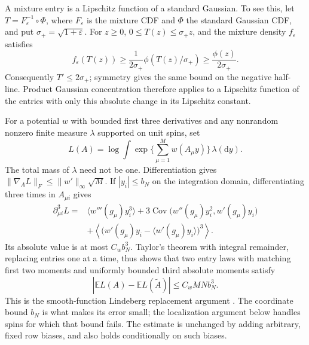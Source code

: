 \documentclass[11pt,a4paper]{article}
\numberwithin{equation}{section}
\theoremstyle{definition}
\theoremstyle{remark}
\newcommand{\E}{\mathbb E}
\newcommand{\dd}{\mathrm d}
\newcommand{\eps}{\varepsilon}
\DeclareMathOperator{\Cov}{Cov}
\begin{document}
A mixture entry is a Lipschitz function of a standard Gaussian.  To see
this, let $T=F_\eps^{-1}\circ\Phi$, where $F_\eps$ is the mixture
CDF and $\Phi$ the standard Gaussian CDF, and put
$\sigma_+=\sqrt{1+\eps}$.  For $z\ge0$,
$0\le T(z)\le\sigma_+z$, and the mixture density $f_\eps$ satisfies
\[
 f_\eps(T(z))\ge \frac1{2\sigma_+}
       \phi(T(z)/\sigma_+)\ge\frac{\phi(z)}{2\sigma_+}.
\]
Consequently $T'\le2\sigma_+$; symmetry gives the same bound on the
negative half-line.  Product Gaussian concentration therefore applies to
a Lipschitz function of the entries with only this absolute change in its
Lipschitz constant.

For a potential $w$ with bounded first three derivatives and any
nonrandom nonzero finite measure $\lambda$ supported on unit spins, set
\[
 L(A)=\log\int\exp\Big\{\sum_{\mu=1}^M w(A_\mu y)\Big\}\,\lambda(\dd y).
\]
The total mass of $\lambda$ need not be one.  Differentiation gives
$\|\nabla_A L\|_F\le\|w'\|_\infty\sqrt M$.  If
$|y_i|\le b_N$ on the integration domain, differentiating three times in
$A_{\mu i}$ gives
\begin{align*}
 \partial_{\mu i}^3L={}&\langle w'''(g_\mu)y_i^3\rangle
 +3\Cov\big(w''(g_\mu)y_i^2,w'(g_\mu)y_i\big)\\
 &+\left\langle\big(w'(g_\mu)y_i-
             \langle w'(g_\mu)y_i\rangle\big)^3\right\rangle .
\end{align*}
Its absolute value is at most $C_wb_N^3$.  Taylor's theorem with integral
remainder, replacing entries one at a time, thus shows that two entry
laws with matching first two moments and uniformly bounded third absolute
moments satisfy
\begin{equation}\label{eq:univ-replacement}
 |\E L(A)-\E L(\widetilde A)|\le C_wMN b_N^3.
\end{equation}
This is the smooth-function Lindeberg replacement argument
\cite[Theorem~1.1]{Chatterjee2006Lindeberg}. The coordinate bound $b_N$
is what makes its error small; the localization argument below handles
spins for which that bound fails. The estimate is unchanged by adding
arbitrary, fixed row biases, and also holds conditionally on such biases.
\end{document}
